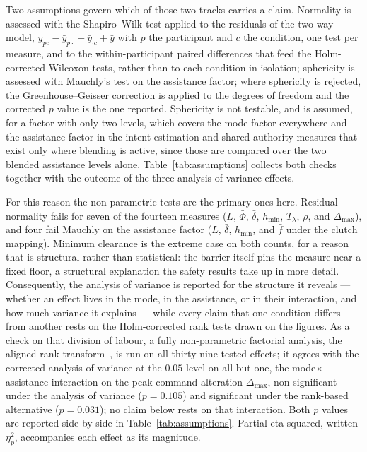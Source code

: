 Two assumptions govern which of those two tracks carries a claim. Normality is assessed with the Shapiro--Wilk test applied to the residuals of the two-way model, $y_{pc} - \bar y_{p\cdot} - \bar y_{\cdot c} + \bar y$ with $p$ the participant and $c$ the condition, one test per measure, and to the within-participant paired differences that feed the Holm-corrected Wilcoxon tests, rather than to each condition in isolation; sphericity is assessed with Mauchly's test on the assistance factor; where sphericity is rejected, the Greenhouse--Geisser correction is applied to the degrees of freedom and the corrected $p$ value is the one reported. Sphericity is not testable, and is assumed, for a factor with only two levels, which covers the mode factor everywhere and the assistance factor in the intent-estimation and shared-authority measures that exist only where blending is active, since those are compared over the two blended assistance levels alone. Table~\ref{tab:assumptions} collects both checks together with the outcome of the three analysis-of-variance effects.

For this reason the non-parametric tests are the primary ones here. Residual normality fails for seven of the fourteen measures ($L$, $\bar\Phi$, $\bar\delta$, $h_{\min}$, $T_\lambda$, $\rho$, and $\Delta_{\max}$), and four fail Mauchly on the assistance factor ($L$, $\bar\delta$, $h_{\min}$, and $\bar f$ under the clutch mapping). Minimum clearance is the extreme case on both counts, for a reason that is structural rather than statistical: the barrier itself pins the measure near a fixed floor, a structural explanation the safety results take up in more detail. Consequently, the analysis of variance is reported for the structure it reveals --- whether an effect lives in the mode, in the assistance, or in their interaction, and how much variance it explains --- while every claim that one condition differs from another rests on the Holm-corrected rank tests drawn on the figures. As a check on that division of labour, a fully non-parametric factorial analysis, the aligned rank transform~\cite{wobbrock2011art}, is run on all thirty-nine tested effects; it agrees with the corrected analysis of variance at the $0.05$ level on all but one, the mode$\times$assistance interaction on the peak command alteration $\Delta_{\max}$, non-significant under the analysis of variance ($p = 0.105$) and significant under the rank-based alternative ($p = 0.031$); no claim below rests on that interaction. Both $p$ values are reported side by side in Table~\ref{tab:assumptions}. Partial eta squared, written $\eta^2_p$, accompanies each effect as its magnitude.



